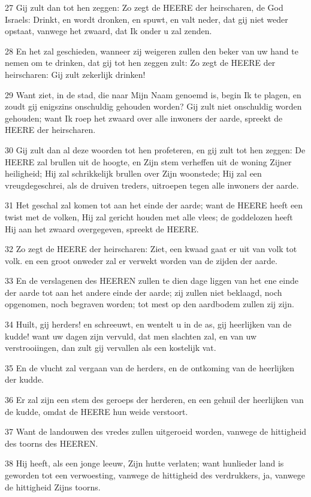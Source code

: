 \par 27 Gij zult dan tot hen zeggen: Zo zegt de HEERE der heirscharen, de God Israels: Drinkt, en wordt dronken, en spuwt, en valt neder, dat gij niet weder opstaat, vanwege het zwaard, dat Ik onder u zal zenden.
\par 28 En het zal geschieden, wanneer zij weigeren zullen den beker van uw hand te nemen om te drinken, dat gij tot hen zeggen zult: Zo zegt de HEERE der heirscharen: Gij zult zekerlijk drinken!
\par 29 Want ziet, in de stad, die naar Mijn Naam genoemd is, begin Ik te plagen, en zoudt gij enigszins onschuldig gehouden worden? Gij zult niet onschuldig worden gehouden; want Ik roep het zwaard over alle inwoners der aarde, spreekt de HEERE der heirscharen.
\par 30 Gij zult dan al deze woorden tot hen profeteren, en gij zult tot hen zeggen: De HEERE zal brullen uit de hoogte, en Zijn stem verheffen uit de woning Zijner heiligheid; Hij zal schrikkelijk brullen over Zijn woonstede; Hij zal een vreugdegeschrei, als de druiven treders, uitroepen tegen alle inwoners der aarde.
\par 31 Het geschal zal komen tot aan het einde der aarde; want de HEERE heeft een twist met de volken, Hij zal gericht houden met alle vlees; de goddelozen heeft Hij aan het zwaard overgegeven, spreekt de HEERE.
\par 32 Zo zegt de HEERE der heirscharen: Ziet, een kwaad gaat er uit van volk tot volk. en een groot onweder zal er verwekt worden van de zijden der aarde.
\par 33 En de verslagenen des HEEREN zullen te dien dage liggen van het ene einde der aarde tot aan het andere einde der aarde; zij zullen niet beklaagd, noch opgenomen, noch begraven worden; tot mest op den aardbodem zullen zij zijn.
\par 34 Huilt, gij herders! en schreeuwt, en wentelt u in de as, gij heerlijken van de kudde! want uw dagen zijn vervuld, dat men slachten zal, en van uw verstrooiingen, dan zult gij vervallen als een kostelijk vat.
\par 35 En de vlucht zal vergaan van de herders, en de ontkoming van de heerlijken der kudde.
\par 36 Er zal zijn een stem des geroeps der herderen, en een gehuil der heerlijken van de kudde, omdat de HEERE hun weide verstoort.
\par 37 Want de landouwen des vredes zullen uitgeroeid worden, vanwege de hittigheid des toorns des HEEREN.
\par 38 Hij heeft, als een jonge leeuw, Zijn hutte verlaten; want hunlieder land is geworden tot een verwoesting, vanwege de hittigheid des verdrukkers, ja, vanwege de hittigheid Zijns toorns.

